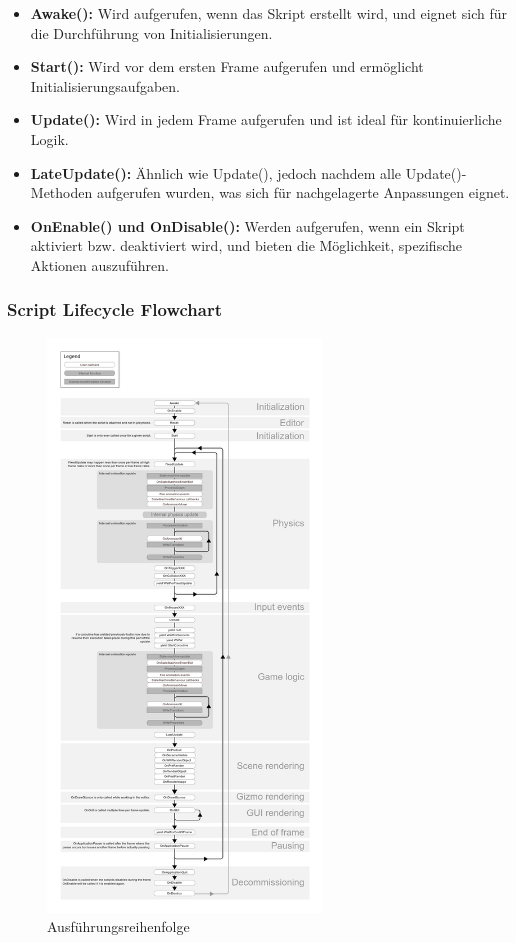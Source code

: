 \begin{itemize}
    \item \textbf{Awake():} Wird aufgerufen, wenn das Skript erstellt wird, und eignet sich für die Durchführung von
    Initialisierungen.
    \item \textbf{Start():} Wird vor dem ersten Frame aufgerufen und ermöglicht Initialisierungsaufgaben.
    \item \textbf{Update():} Wird in jedem Frame aufgerufen und ist ideal für kontinuierliche Logik.
    \item \textbf{LateUpdate():} Ähnlich wie Update(), jedoch nachdem alle Update()-Methoden aufgerufen wurden, was sich
    für nachgelagerte Anpassungen eignet.
    \item \textbf{OnEnable() und OnDisable():} Werden aufgerufen, wenn ein Skript aktiviert bzw. deaktiviert wird, und
    bieten die Möglichkeit, spezifische Aktionen auszuführen.
\end{itemize}

\subsubsection*{Script Lifecycle Flowchart}
\begin{figure}[H]
    \centering
    \includegraphics[width=0.65\textwidth]{images/monobehaviour_flowchart}
    \caption{Ausführungsreihenfolge\protect\footnotemark}
\end{figure}

